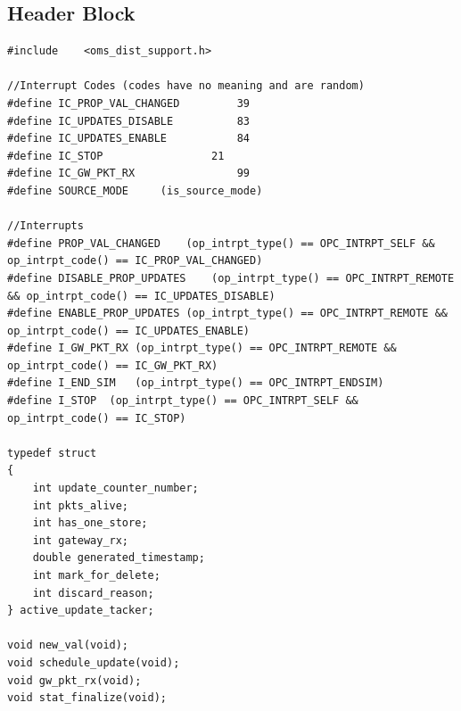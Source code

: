 \subsection{Header Block}
{\tiny
\begin{verbatim}
#include	<oms_dist_support.h>

//Interrupt Codes (codes have no meaning and are random)
#define IC_PROP_VAL_CHANGED 		39
#define IC_UPDATES_DISABLE	 		83
#define IC_UPDATES_ENABLE			84
#define IC_STOP					21
#define IC_GW_PKT_RX				99
#define SOURCE_MODE		(is_source_mode)

//Interrupts 
#define PROP_VAL_CHANGED	(op_intrpt_type() == OPC_INTRPT_SELF && op_intrpt_code() == IC_PROP_VAL_CHANGED)
#define DISABLE_PROP_UPDATES	(op_intrpt_type() == OPC_INTRPT_REMOTE && op_intrpt_code() == IC_UPDATES_DISABLE)
#define ENABLE_PROP_UPDATES	(op_intrpt_type() == OPC_INTRPT_REMOTE && op_intrpt_code() == IC_UPDATES_ENABLE)
#define I_GW_PKT_RX	(op_intrpt_type() == OPC_INTRPT_REMOTE && op_intrpt_code() == IC_GW_PKT_RX)
#define I_END_SIM	(op_intrpt_type() == OPC_INTRPT_ENDSIM)
#define I_STOP	(op_intrpt_type() == OPC_INTRPT_SELF && op_intrpt_code() == IC_STOP)

typedef struct
{
	int update_counter_number;
	int pkts_alive;
	int has_one_store;
	int gateway_rx;
	double generated_timestamp;
	int mark_for_delete;
	int discard_reason;
} active_update_tacker;

void new_val(void);
void schedule_update(void);
void gw_pkt_rx(void);
void stat_finalize(void);
\end{verbatim}
}

